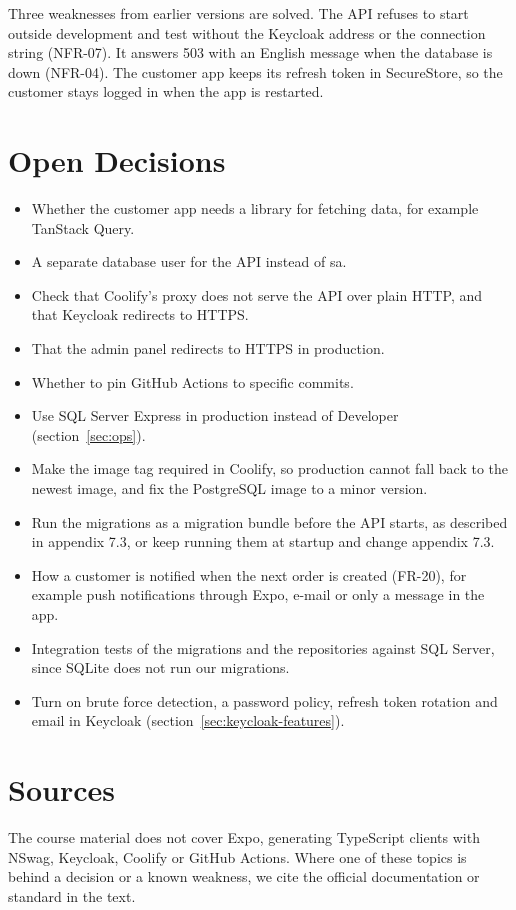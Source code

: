 \documentclass[a4paper,11pt]{article}
\begin{document}
Three weaknesses from earlier versions are solved. The API refuses to start outside development and test without the Keycloak address or the connection string (NFR-07). It answers 503 with an English message when the database is down (NFR-04). The customer app keeps its refresh token in SecureStore, so the customer stays logged in when the app is restarted.

\section{Open Decisions}
\begin{itemize}
    \item Whether the customer app needs a library for fetching data, for example TanStack Query.
    \item A separate database user for the API instead of sa.
    \item Check that Coolify's proxy does not serve the API over plain HTTP, and that Keycloak redirects to HTTPS.
    \item That the admin panel redirects to HTTPS in production.
    \item Whether to pin GitHub Actions to specific commits.
    \item Use SQL Server Express in production instead of Developer (section~\ref{sec:ops}).
    \item Make the image tag required in Coolify, so production cannot fall back to the newest image, and fix the PostgreSQL image to a minor version.
    \item Run the migrations as a migration bundle before the API starts, as described in appendix 7.3, or keep running them at startup and change appendix 7.3.
    \item How a customer is notified when the next order is created (FR-20), for example push notifications through Expo, e-mail or only a message in the app.
    \item Integration tests of the migrations and the repositories against SQL Server, since SQLite does not run our migrations.
    \item Turn on brute force detection, a password policy, refresh token rotation and email in Keycloak (section~\ref{sec:keycloak-features}).
\end{itemize}

\section*{Sources}
The course material does not cover Expo, generating TypeScript clients with NSwag, Keycloak, Coolify or GitHub Actions. Where one of these topics is behind a decision or a known weakness, we cite the official documentation or standard in the text.

\printbibliography
\end{document}
